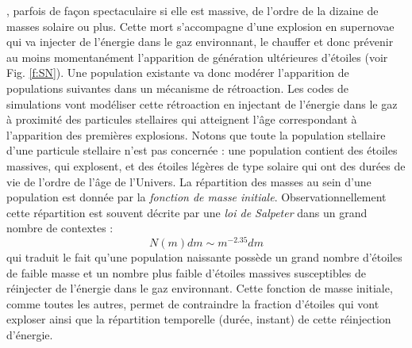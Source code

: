 , parfois de façon spectaculaire si elle est massive, de l'ordre de la dizaine de masses solaire ou plus. Cette mort s'accompagne d'une explosion en supernovae qui va injecter de l'énergie dans le gaz environnant, le chauffer et donc prévenir au moins momentanément l'apparition de génération ultérieures d'étoiles (voir Fig. \ref{f:SN}). Une population existante va donc modérer l'apparition de populations suivantes dans un mécanisme de rétroaction. Les codes de simulations vont modéliser cette rétroaction en injectant de l'énergie dans le gaz à proximité des particules stellaires qui atteignent l'âge correspondant à l'apparition des premières explosions. Notons que toute la population stellaire d'une particule stellaire n'est pas concernée : une population contient des étoiles massives, qui explosent, et des étoiles légères de type solaire qui ont des durées de vie de l'ordre de l'âge de l'Univers. La répartition des masses au sein d'une population est donnée par la \textit{fonction de masse initiale}. Observationnellement cette répartition est souvent décrite par une \textit{loi de Salpeter} dans un grand nombre de contextes :
\begin{equation}
N(m)dm\sim m^{-2.35}dm
\end{equation}
qui traduit le fait qu'une population naissante possède un grand nombre d'étoiles de faible masse et un nombre plus faible d'étoiles massives susceptibles de réinjecter de l'énergie dans le gaz environnant. Cette fonction de masse initiale, comme toutes les autres, permet de contraindre la fraction d'étoiles qui vont exploser ainsi que la répartition temporelle (durée, instant) de cette réinjection d'énergie.

